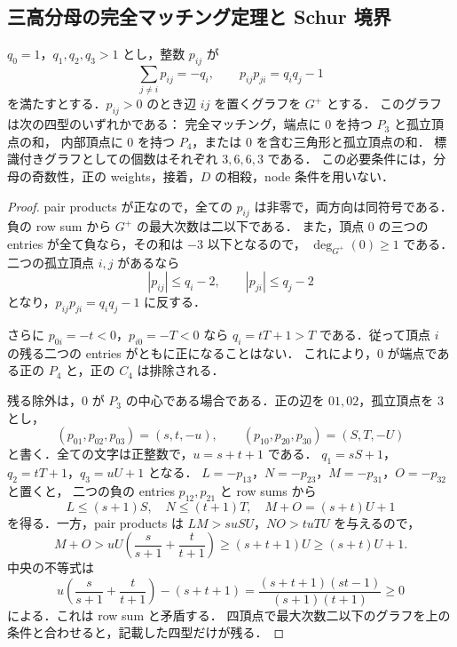 
\subsection{三高分母の完全マッチング定理と Schur 境界}
\label{sm14:section}

\begin{proposition}[三高分母に残る四つの正符号型]
\label{sm14:four-sign-types}
$q_0=1$，$q_1,q_2,q_3>1$ とし，整数 $p_{ij}$ が
\[
 \sum_{j\ne i}p_{ij}=-q_i,
 \qquad p_{ij}p_{ji}=q_iq_j-1
\]
を満たすとする．$p_{ij}>0$ のとき辺 $ij$ を置くグラフを $G^+$ とする．
このグラフは次の四型のいずれかである：
完全マッチング，端点に $0$ を持つ $P_3$ と孤立頂点の和，
内部頂点に $0$ を持つ $P_4$，または $0$ を含む三角形と孤立頂点の和．
標識付きグラフとしての個数はそれぞれ $3,6,6,3$ である．
この必要条件には，分母の奇数性，正の weights，接着，$D$ の相殺，node 条件を用いない．
\end{proposition}

\begin{proof}
pair products が正なので，全ての $p_{ij}$ は非零で，両方向は同符号である．
負の row sum から $G^+$ の最大次数は二以下である．
また，頂点 $0$ の三つの entries が全て負なら，その和は $-3$ 以下となるので，
$\deg_{G^+}(0)\geq1$ である．二つの孤立頂点 $i,j$ があるなら
\[
 |p_{ij}|\leq q_i-2,\qquad |p_{ji}|\leq q_j-2
\]
となり，$p_{ij}p_{ji}=q_iq_j-1$ に反する．

さらに $p_{0i}=-t<0$，$p_{i0}=-T<0$ なら
$q_i=tT+1>T$ である．従って頂点 $i$ の残る二つの entries がともに正になることはない．
これにより，$0$ が端点である正の $P_4$ と，正の $C_4$ は排除される．

残る除外は，$0$ が $P_3$ の中心である場合である．正の辺を $01,02$，孤立頂点を $3$ とし，
\[
 (p_{01},p_{02},p_{03})=(s,t,-u),\qquad
 (p_{10},p_{20},p_{30})=(S,T,-U)
\]
と書く．全ての文字は正整数で，$u=s+t+1$ である．
$q_1=sS+1$，$q_2=tT+1$，$q_3=uU+1$ となる．
$L=-p_{13}$，$N=-p_{23}$，$M=-p_{31}$，$O=-p_{32}$ と置くと，
二つの負の entries $p_{12},p_{21}$ と row sums から
\[
 L\leq(s+1)S,\quad N\leq(t+1)T,
 \quad M+O=(s+t)U+1
\]
を得る．一方，pair products は
$LM>suSU$，$NO>tuTU$ を与えるので，
\[
 M+O>uU\left(\frac{s}{s+1}+\frac{t}{t+1}\right)
 \geq(s+t+1)U\geq(s+t)U+1.
\]
中央の不等式は
\[
 u\left(\frac{s}{s+1}+\frac{t}{t+1}\right)-(s+t+1)
 =\frac{(s+t+1)(st-1)}{(s+1)(t+1)}\geq0
\]
による．これは row sum と矛盾する．
四頂点で最大次数二以下のグラフを上の条件と合わせると，記載した四型だけが残る．
\end{proof}

